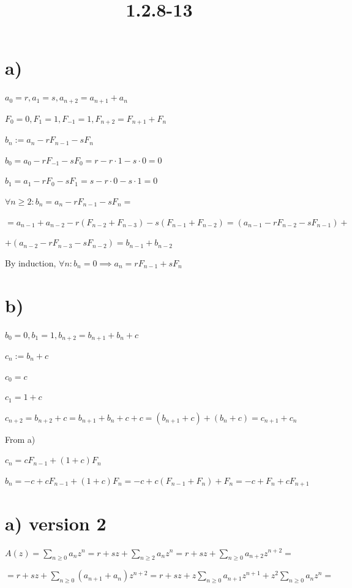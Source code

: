 \documentclass{article}
\title{1.2.8-13}
\begin{document}
\maketitle

\section*{a)}

$a_0 = r, a_1=s, a_{n+2} = a_{n+1} + a_n$

$F_0 = 0, F_1=1, F_{-1}=1, F_{n+2} = F_{n+1} + F_n$

$b_n := a_n - rF_{n-1} - sF_{n}$

$b_0 = a_0 - rF_{-1} - s F_0 = r - r \cdot 1 - s \cdot 0 = 0$

$b_1 = a_1 - rF_0 - s F_1 = s - r \cdot 0 - s \cdot 1 = 0$

$\forall n \geq 2: b_n = a_n - rF_{n-1} - sF_{n} =$

$= a_{n-1} + a_{n-2} - r (F_{n-2} + F_{n-3}) - s (F_{n-1} + F_{n-2}) = (a_{n-1} - rF_{n-2} - sF_{n-1}) +$

$+ (a_{n-2} - rF_{n-3} - sF_{n-2})  = b_{n-1} + b_{n-2}$

By induction, $\forall n: b_n = 0 \implies a_n = rF_{n-1} + s F_n$

\section*{b)}

$b_0 = 0, b_1 = 1, b_{n+2} = b_{n+1} + b_n + c$

$c_n := b_n + c$

$c_0 = c$

$c_1 = 1 + c$

$c_{n + 2} = b_{n+2} + c = b_{n+1} + b_{n} + c + c= (b_{n+1} + c) + (b_{n} + c) = c_{n+1} + c_n$

From a)

$c_n = cF_{n-1} + (1+c)F_n$

$b_n = -c + cF_{n-1} + (1+c)F_n = -c + c(F_{n-1}+F_n) + F_n = -c + F_n + cF_{n+1}$

\section*{a) version 2}

$A(z) = \sum_{n \geq 0} a_n z^n = r + sz + \sum_{n \geq 2} a_n z^{n} = r + sz + \sum_{n \geq 0} a_{n+2}z^{n+2} =$

$= r + sz + \sum_{n \geq 0} (a_{n+1} + a_n) z^{n+2} = r + sz + z \sum_{n \geq 0} a_{n+1} z^{n+1} + z^2 \sum_{n \geq 0} a_n z^{n} =$
\end{document}
